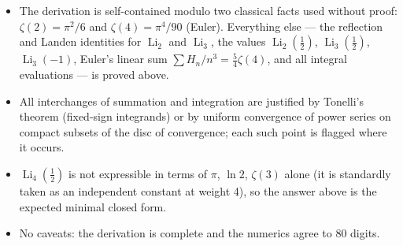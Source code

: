 \documentclass[11pt]{article}
\theoremstyle{remark}
\begin{document}
\begin{itemize}
\item The derivation is self-contained modulo two classical facts used without proof: $\zeta(2)=\pi^2/6$ and $\zeta(4)=\pi^4/90$ (Euler). Everything else --- the reflection and Landen identities for $\operatorname{Li}_2$ and $\operatorname{Li}_3$, the values $\operatorname{Li}_2(\tfrac12)$, $\operatorname{Li}_3(\tfrac12)$, $\operatorname{Li}_3(-1)$, Euler's linear sum $\sum H_n/n^3=\frac54\zeta(4)$, and all integral evaluations --- is proved above.
\item All interchanges of summation and integration are justified by Tonelli's theorem (fixed-sign integrands) or by uniform convergence of power series on compact subsets of the disc of convergence; each such point is flagged where it occurs.
\item $\operatorname{Li}_4(\tfrac12)$ is not expressible in terms of $\pi$, $\ln2$, $\zeta(3)$ alone (it is standardly taken as an independent constant at weight 4), so the answer above is the expected minimal closed form.
\item No caveats: the derivation is complete and the numerics agree to 80 digits.
\end{itemize}
\end{document}
